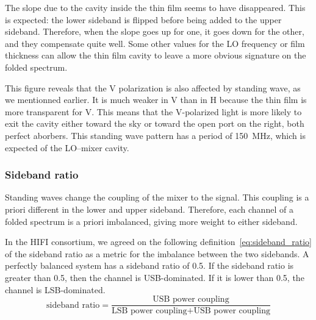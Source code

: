 The slope due to the cavity inside the thin film seems to have disappeared.
This is expected: the lower sideband is flipped before being added to the upper sideband.
Therefore, when the slope goes up for one, it goes down for the other,
and they compensate quite well.
Some other values for the LO frequency or film thickness can allow the thin film cavity to leave a more obvious signature on the folded spectrum.

This figure reveals that the V polarization is also affected by standing wave, as we mentionned earlier.
It is much weaker in V than in H because the thin film is more transparent for V.
This means that the V-polarized light is more likely to exit the cavity either toward the sky or toward the open port on the right, both perfect aborbers.
This standing wave pattern has a period of \SI{150}{\mega\hertz}, which is expected of the LO--mixer cavity.

\subsubsection{Sideband ratio}
Standing waves change the coupling of the mixer to the signal.
This coupling is a priori different in the lower and upper sideband.
Therefore, each channel of a folded spectrum is a priori imbalanced, giving more weight to either sideband.

In the HIFI consortium, we agreed on the following definition~\eqref{eq:sideband_ratio} of the sideband ratio as a metric for the imbalance between the two sidebands.
A perfectly balanced system has a sideband ratio of 0.5.
If the sideband ratio is greater than 0.5, then the channel is USB-dominated.
If it is lower than 0.5, the channel is LSB-dominated.
\begin{equation}
    \text{sideband ratio} =
    \frac{
        \text{USB power coupling}
    }{
        \text{LSB power coupling} + \text{USB power coupling}
    }
    \label{eq:sideband_ratio}
\end{equation}

